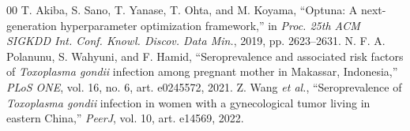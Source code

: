 \documentclass[conference]{IEEEtran}
\begin{document}
\begin{thebibliography}{00}
 T. Akiba, S. Sano, T. Yanase, T. Ohta, and M. Koyama, ``Optuna: A next-generation hyperparameter optimization framework,'' in \emph{Proc. 25th ACM SIGKDD Int. Conf. Knowl. Discov. Data Min.}, 2019, pp. 2623--2631.
 N. F. A. Polanunu, S. Wahyuni, and F. Hamid, ``Seroprevalence and associated risk factors of \emph{Toxoplasma gondii} infection among pregnant mother in Makassar, Indonesia,'' \emph{PLoS ONE}, vol. 16, no. 6, art. e0245572, 2021.
 Z. Wang \emph{et al.}, ``Seroprevalence of \emph{Toxoplasma gondii} infection in women with a gynecological tumor living in eastern China,'' \emph{PeerJ}, vol. 10, art. e14569, 2022.
\end{thebibliography}
\end{document}
